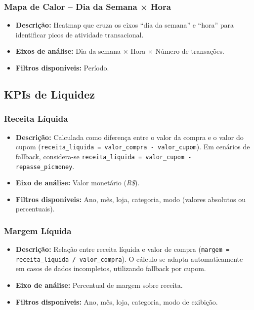 \documentclass[12pt]{article}
\begin{document}
\subsubsection{Mapa de Calor – Dia da Semana × Hora}
\begin{itemize}
    \item \textbf{Descrição:} Heatmap que cruza os eixos “dia da semana” e “hora” para identificar picos de atividade transacional.
    \item \textbf{Eixos de análise:} Dia da semana × Hora × Número de transações.
    \item \textbf{Filtros disponíveis:} Período.
\end{itemize}

\subsection{KPIs de Liquidez}

\subsubsection{Receita Líquida}
\begin{itemize}
    \item \textbf{Descrição:} Calculada como diferença entre o valor da compra e o valor do cupom (\texttt{receita\_liquida = valor\_compra - valor\_cupom}). 
    Em cenários de fallback, considera-se \texttt{receita\_liquida = valor\_cupom - repasse\_picmoney}.
    \item \textbf{Eixo de análise:} Valor monetário (\textit{R\$}).
    \item \textbf{Filtros disponíveis:} Ano, mês, loja, categoria, modo (valores absolutos ou percentuais).
\end{itemize}

\subsubsection{Margem Líquida}
\begin{itemize}
    \item \textbf{Descrição:} Relação entre receita líquida e valor de compra (\texttt{margem = receita\_liquida / valor\_compra}). 
    O cálculo se adapta automaticamente em casos de dados incompletos, utilizando fallback por cupom.
    \item \textbf{Eixo de análise:} Percentual de margem sobre receita.
    \item \textbf{Filtros disponíveis:} Ano, mês, loja, categoria, modo de exibição.
\end{itemize}
\end{document}
